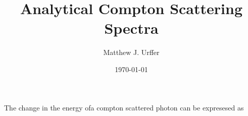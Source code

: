 \documentclass[draftcls,onecolumn]{IEEEtran}
\begin{document}
\title{Analytical Compton Scattering Spectra}
\author{Matthew J. Urffer}
\date{\today}
\maketitle

\printnomenclature

\listoftodos
\tableofcontents
\listoffigures
\listoftables
\lstlistoflistings

The change in the energy ofa compton scattered photon can be expresesed as
\end{document}
